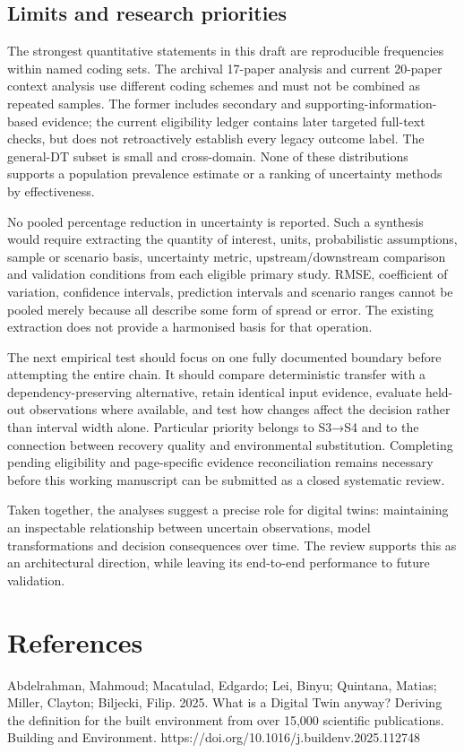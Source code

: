 \subsection{Limits and research priorities}
The strongest quantitative statements in this draft are reproducible frequencies within named coding sets. The archival 17-paper analysis and current 20-paper context analysis use different coding schemes and must not be combined as repeated samples. The former includes secondary and supporting-information-based evidence; the current eligibility ledger contains later targeted full-text checks, but does not retroactively establish every legacy outcome label. The general-DT subset is small and cross-domain. None of these distributions supports a population prevalence estimate or a ranking of uncertainty methods by effectiveness.

No pooled percentage reduction in uncertainty is reported. Such a synthesis would require extracting the quantity of interest, units, probabilistic assumptions, sample or scenario basis, uncertainty metric, upstream/downstream comparison and validation conditions from each eligible primary study. RMSE, coefficient of variation, confidence intervals, prediction intervals and scenario ranges cannot be pooled merely because all describe some form of spread or error. The existing extraction does not provide a harmonised basis for that operation.

The next empirical test should focus on one fully documented boundary before attempting the entire chain. It should compare deterministic transfer with a dependency-preserving alternative, retain identical input evidence, evaluate held-out observations where available, and test how changes affect the decision rather than interval width alone. Particular priority belongs to S3→S4 and to the connection between recovery quality and environmental substitution. Completing pending eligibility and page-specific evidence reconciliation remains necessary before this working manuscript can be submitted as a closed systematic review.

Taken together, the analyses suggest a precise role for digital twins: maintaining an inspectable relationship between uncertain observations, model transformations and decision consequences over time. The review supports this as an architectural direction, while leaving its end-to-end performance to future validation.


\section*{References}
Abdelrahman, Mahmoud; Macatulad, Edgardo; Lei, Binyu; Quintana, Matias; Miller, Clayton; Biljecki, Filip. 2025. What is a Digital Twin anyway? Deriving the definition for the built environment from over 15,000 scientific publications. Building and Environment. https://doi.org/10.1016/j.buildenv.2025.112748

